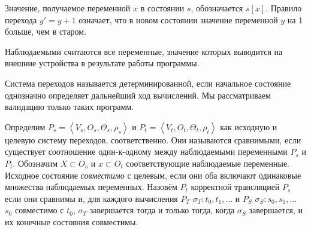 Значение, получаемое переменной $x$ в состоянии $s$, обозначается $s[x]$. Правило перехода $y' = y + 1$ означает, что в новом состоянии значение переменной $y$ на 1 больше, чем в старом.

Наблюдаемыми считаются все переменные, значение которых выводится на внешние устройства в результате работы программы.

Система переходов называется детерминированной, если начальное состояние однозначно определяет дальнейший ход вычислений. Мы рассматриваем валидацию только таких программ.

Определим $P_{s} = \left\langle  V_{s}, O_{s}, \Theta_{s}, \rho_{s} \right\rangle $ и $P_{t} = \left\langle  V_{t}, O_{t}, \Theta_{t}, \rho_{t} \right\rangle $ как исходную и целевую систему переходов, соответственно. Они называются сравнимыми, если существует соотношение один-к-одному между наблюдаемыми переменными $P_{s}$ и $P_{t}$. Обозначим $ X \subset O_{s} $ и $ x \subset O_{t} $ соответствующие наблюдаемые переменные. Исходное состояние \emph{совместимо} с целевым, если они оба включают одинаковые множества наблюдаемых переменных. Назовём $P_{t}$ корректной трансляцией $P_{s}$ если они сравнимы и, для каждого вычисления $P_{T}$ $\sigma_{T}: t_{0}, t_{1}, \ldots$ и $P_{S}$ $\sigma_{S}: s_{0}, s_{1}, \ldots $ $s_{0}$ совместимо с $t_{0}$, $\sigma_{T}$ завершается тогда и только тогда, когда $\sigma_{S}$ завершается, и их конечные состояния совместимы.
